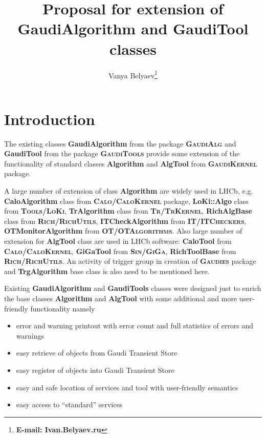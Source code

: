 \documentclass{lhcbnote}
\newcommand{\bftt}         {\ttfamily\bfseries}
\newcommand{\scbf}         {\scshape\bfseries}
\renewcommand{\tt}         {\ttfamily}
\begin{document}
\lstset{language=[ANSI]C++}
\lstset{indent=15mm}
\lstset{labelstep=1}
\lstset{labelstyle=\tt\tiny}


\docmod{\today}

\title{Proposal for extension of {\bftt{GaudiAlgorithm}} and {\bftt{GaudiTool}} classes}
\author{Vanya Belyaev\footnote{\bftt{E-mail: Ivan.Belyaev\@itep.ru}}}
\maketitle

\chapter{Introduction}

The existing classes {\bftt{GaudiAlgorithm}} from the  
package {\scbf{GaudiAlg}} and 
{\bftt{GaudiTool}} from the package 
{\scbf{GaudiTools}} provide some extension of 
the functionality of standard classes {\bftt{Algorithm}}
and {\bftt{AlgTool}} from {\scbf{GaudiKernel}} package. 

A large number of extension of 
class {\bftt{Algorithm}} are widely used in 
LHCb, e.g. {\bftt{CaloAlgorithm}} class from 
{\scbf{Calo/CaloKernel}} package, {\bftt{LoKi::Algo}} 
class from {\scbf{Tools/LoKi}}, {\bftt{TrAlgorithm}} 
class from {\scbf{Tr/TrKernel}}, 
{\bftt{RichAlgBase}} class from {\scbf{Rich/RichUtils}},
{\bftt{ITCheckAlgorithm}} from 
{\scbf{IT/ITCheckers}}, 
{\bftt{OTMonitorAlgorithm}} from {\scbf{OT/OTAlgorithms}}.
Also large number of extension for {\bftt{AlgTool}} class 
are used in LHCb software: 
{\bftt{CaloTool}} from {\scbf{Calo/CaloKernel}},
{\bftt{GiGaTool}} from {\scbf{Sin/GiGa}}, 
{\bftt{RichToolBase}} from 
{\scbf{Rich/RichUtils}}. An activity of trigger 
group in creation of {\scbf{Gaudies}} package and 
{\bftt{TrgAlgorithm}} base class is also need to be mentioned here. 

Existing {\bftt{GaudiAlgorithm}} and 
{\bftt{GaudiTools}} classes were designed 
just to enrich the base classes 
{\bftt{Algorithm}} and {\bftt{AlgTool}} 
with some additional and more user-friendly 
functionality namely
\begin{itemize}
 \item error and warning printout with error count 
   and full statistics of errors and warnings  
 \item easy retrieve of objects from Gaudi Transient Store 
 \item easy register of objects into Gaudi Transient Store 
 \item easy and safe location of services and tool 
       with user-friendly semantics 
 \item easy access to ``standard'' services 
\end{itemize} 
\end{document}
